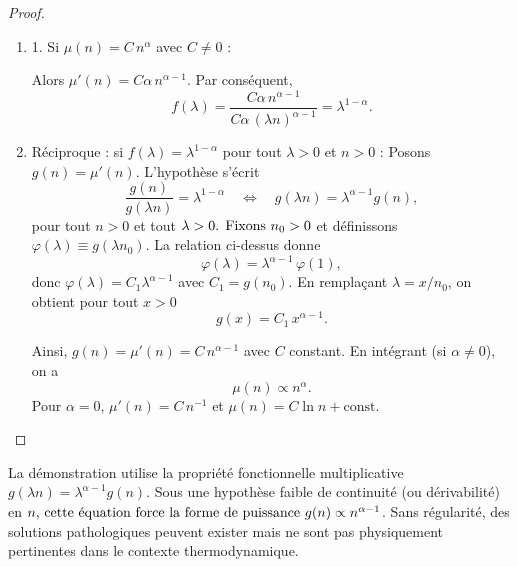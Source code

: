 \begin{proof}

\begin{enumerate}
	\item 1. Si \(\mu(n)=C\,n^\alpha\) avec \(C\neq0\) :

Alors \(\mu'(n)=C\alpha\,n^{\alpha-1}\). Par conséquent,
\[
f(\lambda)=\frac{C\alpha\,n^{\alpha-1}}{C\alpha\,(\lambda n)^{\alpha-1}} = \lambda^{1-\alpha}.
\]

	\item Réciproque : si \(f(\lambda)=\lambda^{1-\alpha}\) pour tout \(\lambda>0\) et \(n>0\) :
Posons \(g(n)=\mu'(n)\). L'hypothèse s'écrit
\[
\frac{g(n)}{g(\lambda n)}=\lambda^{1-\alpha} \quad \Longleftrightarrow \quad g(\lambda n)=\lambda^{\alpha-1} g(n),
\]
pour tout \(n>0\) et tout \(\lambda>0$.

Fixons \(n_0>0\) et définissons \(\varphi(\lambda)\equiv g(\lambda n_0)\). La relation ci-dessus donne
\[
\varphi(\lambda)=\lambda^{\alpha-1}\,\varphi(1),
\]
donc \(\varphi(\lambda)=C_1 \lambda^{\alpha-1}\) avec \(C_1 = g(n_0)\). En remplaçant \(\lambda=x/n_0\), on obtient pour tout \(x>0\)
\[
g(x)=C_1\,x^{\alpha-1}.
\]

Ainsi, \(g(n)=\mu'(n)=C\,n^{\alpha-1}\) avec \(C\) constant. En intégrant (si \(\alpha\neq 0\)), on a
\[
\mu(n) \propto n^\alpha.
\]
Pour \(\alpha=0\), \(\mu'(n)=C\,n^{-1}\) et \(\mu(n)=C\ln n+\text{const}\).
\end{enumerate}
\end{proof}

\begin{Rema}
La démonstration utilise la propriété fonctionnelle multiplicative
\(g(\lambda n)=\lambda^{\alpha-1} g(n)\). Sous une hypothèse faible de continuité (ou dérivabilité) en \(n$, cette équation force la forme de puissance \(g(n)\propto n^{\alpha-1}\). Sans régularité, des solutions pathologiques peuvent exister mais ne sont pas physiquement pertinentes dans le contexte thermodynamique.
\end{Rema}


